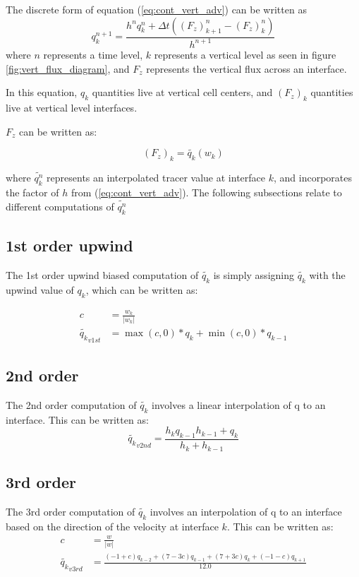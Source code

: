 \documentclass[11pt]{report}
\begin{document}
The discrete form of equation (\ref{eq:cont_vert_adv}) can be written as
\begin{equation}
	q_k^{n+1} = \frac{h^{n}q_k^{n} + \Delta t ( (F_z)_{k+1}^{n} - (F_z)_{k}^{n} )}{h^{n+1}}
\end{equation}
where $n$ represents a time level, $k$ represents a vertical level as seen in figure \ref{fig:vert_flux_diagram}, and $F_z$ represents the vertical flux across an interface.

In this equation, $q_k$ quantities live at vertical cell centers, and $(F_z)_k$ quantities live at vertical level interfaces.

$F_z$ can be written as:

\begin{equation}
	(F_z)_k = \tilde{q_k}(w_k)
\end{equation}

where $\tilde{q_k^n}$ represents an interpolated tracer value at interface $k$, and incorporates the factor of $h$ from (\ref{eq:cont_vert_adv}). The following subsections relate to different computations of $\tilde{q_k^n}$

\subsection{1st order upwind}
The 1st order upwind biased computation of $\tilde{q_k}$ is simply assigning $\tilde{q_k}$ with the upwind value of $q_k$, which can be written as:

\begin{align}
	c &= \frac{w_k}{|w_k|} \\
	\tilde{q_k}_{v 1st} &= \max(c,0)*q_{k} + \min(c,0)*q_{k-1}
\end{align}
\subsection{2nd order}
The 2nd order computation of $\tilde{q_k}$ involves a linear interpolation of q to an interface. This can be written as:
\begin{equation}
	\tilde{q_k}_{v 2nd} = \frac{h_k q_{k-1} h_{k-1} + q_{k}}{h_k + h_{k-1}}
\end{equation}
\subsection{3rd order}
The 3rd order computation of $\tilde{q_k}$ involves an interpolation of q to an interface based on the direction of the velocity at interface $k$. This can be written as:
\begin{align}
	c &= \frac{w}{|w|} \\
	\tilde{q_k}_{v 3rd} &= \frac{ (-1 + c) q_{k-2} + (7 - 3c) q_{k-1} + (7 + 3c) q_k + (-1 - c)q_{k+1}}{12.0}
\end{align}
\end{document}
